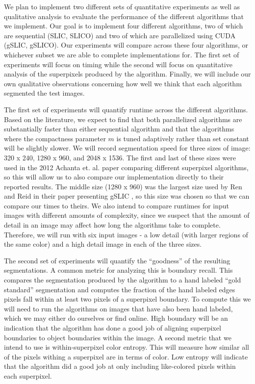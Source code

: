 \documentclass[11pt]{article}
\begin{document}
We plan to implement two different sets of quantitative experiments as well as qualitative analysis to evaluate the performance of the different algorithms that we implement. Our goal is to implement four different algorithms, two of which are sequential (SLIC, SLICO) and two of which are parallelized using CUDA (gSLIC, gSLICO). Our experiments will compare across these four algorithms, or whichever subset we are able to complete implementations for. The first set of experiments will focus on timing while the second will focus on quantitative analysis of the superpixels produced by the algorithm. Finally, we will include our own qualitative observations concerning how well we think that each algorithm segmented the test images.

The first set of experiments will quantify runtime across the different algorithms. Based on the literature, we expect to find that both parallelized algorithms are substantially faster than either sequential algorithm and that the algorithms where the compactness parameter $m$ is tuned adaptively rather than set constant will be slightly slower. We will record segmentation speed for three sizes of image: 320 x 240, 1280 x 960, and 2048 x 1536. The first and last of these sizes were used in the 2012 Achanta et. al. \cite{slic2012} paper comparing different superpixel algorithms, so this will allow us to also compare our implementation directly to their reported results. The middle size (1280 x 960) was the largest size used by Ren and Reid in their paper presenting gSLIC \cite{gslic}, so this size was chosen so that we can compare our times to theirs. We also intend to compare runtimes for input images with different amounts of complexity, since we suspect that the amount of detail in an image may affect how long the algorithms take to complete. Therefore, we will run with six input images - a low detail (with larger regions of the same color) and a high detail image in each of the three sizes.

The second set of experiments will quantify the ``goodness'' of the resulting segmentations. A common metric for analyzing this is boundary recall\cite{dissertationneubert}. This compares the segmentation produced by the algorithm to a hand labeled ``gold standard'' segmentation and computes the fraction of the hand labeled edges pixels fall within at least two pixels of a superpixel boundary. To compute this we will need to run the algorithms on images that have also been hand labeled, which we may either do ourselves or find online. High boundary will be an indication that the algorithm has done a good job of aligning superpixel boundaries to object boundaries within the image. A second metric that we intend to use is within-superpixel color entropy. This will measure how similar all of the pixels withing a superpixel are in terms of color. Low entropy will indicate that the algorithm did a good job at only including like-colored pixels within each superpixel.
\end{document}
